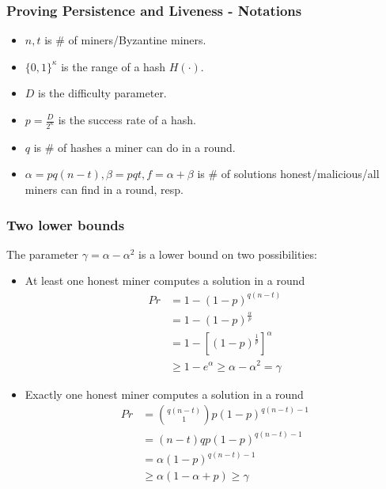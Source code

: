 \documentclass{beamer}
\begin{document}
\begin{frame}
\frametitle{Proving Persistence and Liveness - Notations}

\begin{itemize}
    \item $n, t$ is \# of miners/Byzantine miners.
    \item $\{0, 1\}^\kappa$ is the range of a hash $H(\cdot)$.
    \item $D$ is the difficulty parameter.
    \item $p = \frac{D}{2^\kappa}$ is the success rate of a hash.
    \item $q$ is \# of hashes a miner can do in a round.
    \item $\alpha = pq(n-t), \beta = pqt, f = \alpha + \beta$ is \# of solutions honest/malicious/all miners can find in a round, resp.
\end{itemize}

\end{frame}


\begin{frame}
\frametitle{Two lower bounds}

The parameter $\gamma = \alpha - \alpha^2$ is a lower bound on two possibilities:
\begin{itemize}
    \item At least one honest miner computes a solution in a round
    \begin{align}
        Pr &= 1 - (1-p)^{q(n-t)}\\
           &= 1 - (1-p)^{\frac{\alpha}{p}}\\
           &= 1 - [(1-p)^{\frac{1}{p}}]^\alpha\\
           &\geq 1 - e^\alpha \geq \alpha - \alpha^2 = \gamma
    \end{align}
    \item Exactly one honest miner computes a solution in a round
    \begin{align}
        Pr &= {q(n-t) \choose 1} p(1-p)^{q(n-t)-1}\\
           &= (n-t)qp(1-p)^{q(n-t)-1}\\
           &= \alpha (1-p)^{q(n-t)-1}\\
           &\geq \alpha (1-\alpha+p) \geq \gamma
    \end{align}
\end{itemize}

\end{frame}
\end{document}
